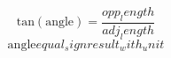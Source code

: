 \[\text{{tan}}(\text{{{angle}}})=\frac{{{opp_length}}}{{{adj_length}}}\]
\[\text{{{angle}}}{equal_sign}{result_with_unit}\]
